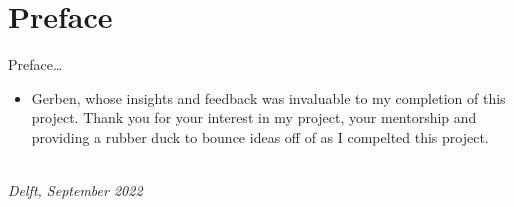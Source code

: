\chapter*{Preface}

Preface\ldots

\begin{itemize}
    \item Gerben, whose insights and feedback was invaluable to my completion of this project. Thank you for your interest in my project, your mentorship and providing a rubber duck to bounce ideas off of as I compelted this project.
\end{itemize}
\begin{flushright}
{\makeatletter\itshape
    \@author \\
    Delft, September 2022
\makeatother}
\end{flushright}

